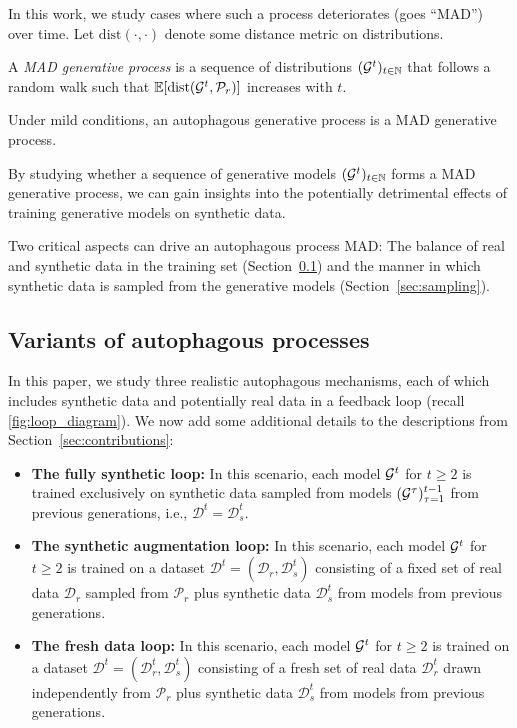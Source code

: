 \documentclass{article}
\def\data{\mathcal{D}}
\def\colorSynthetic{colorA}
\def\colorMixed{colorB}
\def\colorFresh{colorC}
\def\synthetic{\textcolor{\colorSynthetic}{fully synthetic loop}}
\def\mixed{\textcolor{\colorMixed}{synthetic augmentation loop}}
\def\fresh{\textcolor{\colorFresh}{fresh data loop}}
\begin{document}
In this work, we study cases where such a process deteriorates (goes ``MAD'') over time.
Let $\mathrm{dist}(\cdot, \cdot)$ denote some distance metric on distributions.

\medskip
\begin{definition*}
    A \emph{MAD generative process} is a sequence of distributions $(\mathcal{G}^t)_{t\in \mathbb{N}}$ that follows a random walk such that 
    $\mathbb{E}[\mathrm{dist}(\mathcal{G}^t, \mathcal{P}_r)]$ increases with $t$.
    \label{defn:mad}
\end{definition*}


\begin{claim*}
    Under mild conditions, an autophagous generative process is a MAD generative process.
\end{claim*}


By studying whether a sequence of generative models $(\mathcal{G}^t)_{t \in \mathbb{N}}$ forms a MAD generative process, we can gain insights into the potentially detrimental effects of training generative models on synthetic data.
%

%
Two critical aspects can drive an autophagous process MAD: The balance of real and synthetic data in the training set (Section~\ref{sec:loops}) and the manner in which synthetic data is sampled from the generative models (Section~\ref{sec:sampling}).


\subsection{Variants of autophagous processes}
\label{sec:loops}


In this paper, we study three realistic autophagous mechanisms, each of which includes synthetic data and potentially real data in a feedback loop (recall \cref{fig:loop_diagram}).
We now add some additional details to the descriptions from Section~\ref{sec:contributions}:


\begin{itemize}

\item \textbf{The \synthetic{}:} 
In this scenario, each model $\mathcal{G}^t$ for $t \geq 2$ is trained exclusively on synthetic data sampled from models $(\mathcal{G}^\tau)_{\tau=1}^{t-1}$ from previous generations, i.e., $\data^t = \data_s^t$.

\item \textbf{The \mixed{}:} In this scenario, each model $\mathcal{G}^t$ for $t \geq 2$ is trained on a dataset $\data^t = (\data_r,\data_s^t)$ consisting of a fixed set of real data $\data_r$ sampled from $\mathcal{P}_r$ plus synthetic data $\data_s^t$ from 
models from previous generations.


\item \textbf{The \fresh{}:} In this scenario, each model $\mathcal{G}^t$ for $t \geq 2$ is trained on a dataset $\data^t = (\data_r^t,\data_s^t)$ consisting of a fresh set of real data $\data_r^t$ drawn independently from $\mathcal{P}_r$ plus synthetic data $\data_s^t$ from models from previous generations.


\end{itemize}
\end{document}
